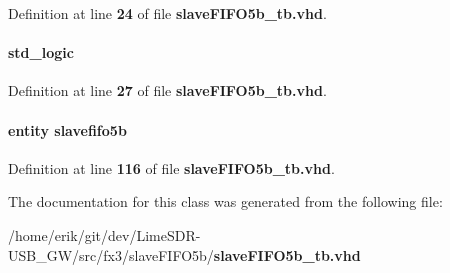 Definition at line {\bf 24} of file {\bf slave\+F\+I\+F\+O5b\+\_\+tb.\+vhd}.

\paragraph[{reset\+\_\+n}]{ {\bfseries \textcolor{comment}{std\+\_\+logic}\textcolor{vhdlchar}{ }} \hspace{0.3cm}{\ttfamily [Signal]}}\label{classslaveFIFO5b__tb_1_1tb__behave_a1f070fd63a3a7fa45c907335ea870c5b}


Definition at line {\bf 27} of file {\bf slave\+F\+I\+F\+O5b\+\_\+tb.\+vhd}.

\paragraph[{slavefifo\+\_\+inst}]{ {\bfseries \textcolor{keywordflow}{entity}\textcolor{vhdlchar}{ }\textcolor{vhdlchar}{slavefifo5b}\textcolor{vhdlchar}{ }} \hspace{0.3cm}{\ttfamily [Instantiation]}}\label{classslaveFIFO5b__tb_1_1tb__behave_aa6735942f6263b4c76c21f3b10efb848}


Definition at line {\bf 116} of file {\bf slave\+F\+I\+F\+O5b\+\_\+tb.\+vhd}.



The documentation for this class was generated from the following file\+:\begin{DoxyCompactItemize}
\item 
/home/erik/git/dev/\+Lime\+S\+D\+R-\/\+U\+S\+B\+\_\+\+G\+W/src/fx3/slave\+F\+I\+F\+O5b/{\bf slave\+F\+I\+F\+O5b\+\_\+tb.\+vhd}\end{DoxyCompactItemize}
